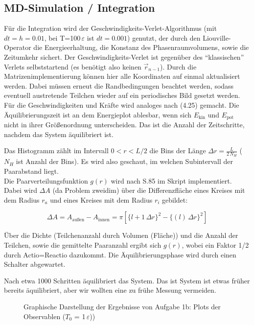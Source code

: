 \subsection*{MD-Simulation / Integration}
Für die Integration wird der Geschwindigkeits-Verlet-Algorithmus (mit $dt=h=0.01$, bei T=100$\,\varepsilon$ ist $dt=0.001$) genutzt, der durch den Liouville-Operator die Energieerhaltung, die Konstanz des Phasenraumvolumens, sowie die Zeitumkehr sichert. Der Geschwindigkeits-Verlet ist gegenüber des \enquote{klassischen} Verlets selbststartend (es benötigt also keinen $\vec{r}_{n-1}$). Durch die Matrizenimplementierung können hier alle Koordinaten auf einmal aktualisiert werden. Dabei müssen erneut die Randbedingungen beachtet werden, sodass eventuell austretende Teilchen wieder auf ein periodisches Bild gesetzt werden. Für die Geschwindigkeiten und Kräfte wird analoges nach (4.25) gemacht. Die Äquilibrierungszeit ist an dem Energieplot ablesbar, wenn sich $E_{\text{kin}}$ und $E_{\text{pot}}$ nicht in ihrer Größenordnung unterscheiden. Das ist die Anzahl der Zeitschritte, nachdem das System äquilibriert ist.

Das Histogramm zählt im Intervall $0<r<L/2$ die Bins der Länge $\Delta r = \frac{L}{2\,N_H}$ ($N_H$ ist Anzahl der Bins). Es wird also geschaut, im welchen Subintervall der Paarabstand liegt.\\

Die Paarverteilungsfunktion $g(r)$ wird nach S.85 im Skript implementiert. Dabei wird $\Delta A$ (da Problem zweidim) über die Differenzfläche eines Kreises mit dem Radius $r_a$ und eines Kreises mit dem Radius $r_i$ gebildet:

\begin{equation*}
\Delta A = A_{\text{außen}} - A_{\text{innen}} = \pi [\{l+1 \, \Delta r\}^2-\{(l)\,\Delta r\}^2]
\end{equation*}


Über die Dichte (Teilchenanzahl durch Volumen (Fläche)) und die Anzahl der Teilchen, sowie die gemittelte Paaranzahl ergibt sich $g(r)$, wobei ein Faktor 1/2 durch Actio=Reactio dazukommt. Die Äquilibrierungsphase wird durch einen Schalter abgewartet.

Nach etwa 1000 Schritten äquilibriert das System. Das ist System ist etwas früher bereits äquilibriert, aber wir wollten eine zu frühe Messung vermeiden.

\begin{landscape}
	\begin{figure}
		\caption{Graphische Darstellung der Ergebnisse von Aufgabe 1b: Plots der Observablen ($T_0$ = 1$\,\varepsilon$))}
		\label{fig:observablen1}
	\end{figure}
\end{landscape} 

